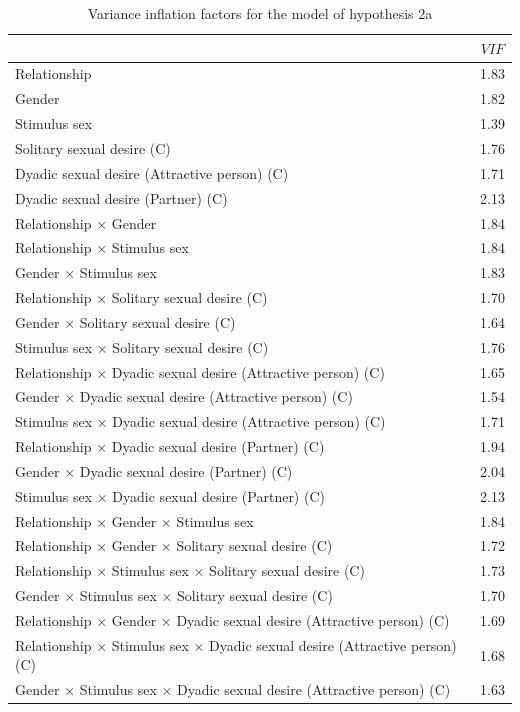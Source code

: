 \documentclass[
  bookmarksnumbered]{article}
\begin{document}
\begin{table}[H]

\caption{\label{tab:coli-m2a}Variance inflation factors for the model of hypothesis 2a}
\centering
\begin{tabular}[t]{lc}
\toprule
  & $VIF$\\
\midrule
Relationship & 1.83\\
Gender & 1.82\\
Stimulus sex & 1.39\\
Solitary sexual desire (C) & 1.76\\
Dyadic sexual desire (Attractive person) (C) & 1.71\\
Dyadic sexual desire (Partner) (C) & 2.13\\
Relationship × Gender & 1.84\\
Relationship × Stimulus sex & 1.84\\
Gender × Stimulus sex & 1.83\\
Relationship × Solitary sexual desire (C) & 1.70\\
Gender × Solitary sexual desire (C) & 1.64\\
Stimulus sex × Solitary sexual desire (C) & 1.76\\
Relationship × Dyadic sexual desire (Attractive person) (C) & 1.65\\
Gender × Dyadic sexual desire (Attractive person) (C) & 1.54\\
Stimulus sex × Dyadic sexual desire (Attractive person) (C) & 1.71\\
Relationship × Dyadic sexual desire (Partner) (C) & 1.94\\
Gender × Dyadic sexual desire (Partner) (C) & 2.04\\
Stimulus sex × Dyadic sexual desire (Partner) (C) & 2.13\\
Relationship × Gender × Stimulus sex & 1.84\\
Relationship × Gender × Solitary sexual desire (C) & 1.72\\
Relationship × Stimulus sex × Solitary sexual desire (C) & 1.73\\
Gender × Stimulus sex × Solitary sexual desire (C) & 1.70\\
Relationship × Gender × Dyadic sexual desire (Attractive person) (C) & 1.69\\
Relationship × Stimulus sex × Dyadic sexual desire (Attractive person) (C) & 1.68\\
Gender × Stimulus sex × Dyadic sexual desire (Attractive person) (C) & 1.63\\

\end{tabular}
\end{table}
\end{document}
